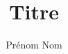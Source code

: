 \documentclass[12pt]{article}		%
\title{Titre}%
\author{Prénom Nom} %
\begin{document}

%

\tableofcontents 
\pagebreak



\newpage

\newpage

\newpage


\pagebreak
\end{document}
